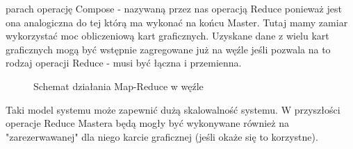\documentclass[paper=a4, fontsize=11pt]{scrartcl} %
\numberwithin{equation}{section} %
\numberwithin{figure}{section} %
\numberwithin{table}{section} %
\begin{document}
\begin{itemize}
		parach operację Compose - nazywaną przez nas operacją Reduce ponieważ jest ona analogiczna do tej którą ma wykonać na końcu Master. Tutaj mamy zamiar wykorzystać
		moc obliczeniową kart graficznych. Uzyskane dane z wielu kart graficznych mogą być wstępnie zagregowane już na węźle jeśli pozwala na to rodzaj operacji Reduce - musi być łączna i przemienna.
		\begin{figure}[t]
			\begin{center}
				\caption{Schemat działania Map-Reduce w węźle}
			\end{center}
		\end{figure}
\end{itemize}
Taki model systemu może zapewnić dużą skalowalność systemu. W przyszłości operacje Reduce Mastera będą mogły być wykonywane również na "zarezerwawanej" dla niego 
karcie graficznej (jeśli okaże się to korzystne).
\end{document}
